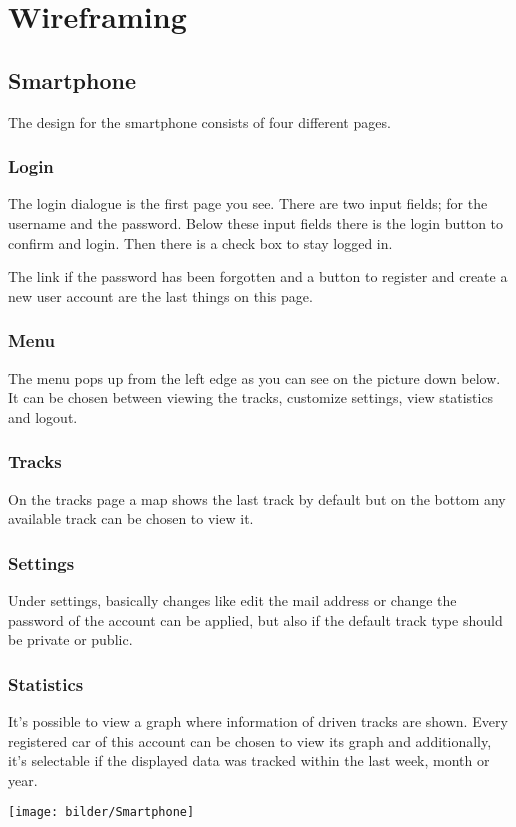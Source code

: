 \chapter{Wireframing}
\section{Smartphone}
The design for the smartphone consists of four different pages. 
\subsection{Login}
The login dialogue is the first page you see. There are two input fields; for the username and the password. Below these input fields there is the login button to confirm and login. Then there is a check box to stay logged in.

The link if the password has been forgotten and a button to register and create a new user account are the last things on this page.
\subsection{Menu}
The menu pops up from the left edge as you can see on the picture down below. It can be chosen between viewing the tracks, customize settings, view statistics and logout.
\subsection{Tracks}
On the tracks page a map shows the last track by default but on the bottom any available track can be chosen to view it.
\subsection{Settings}
Under settings, basically changes like edit the mail address or change the password of the account can be applied, but also if the default track type should be private or public.
\subsection{Statistics}
It’s possible to view a graph where information of driven tracks are shown. Every registered car of this account can be chosen to view its graph and additionally, it’s selectable if the displayed data was tracked within the last week, month or year.
\begin{center}
\texttt{[image: bilder/Smartphone]}
\end{center}
